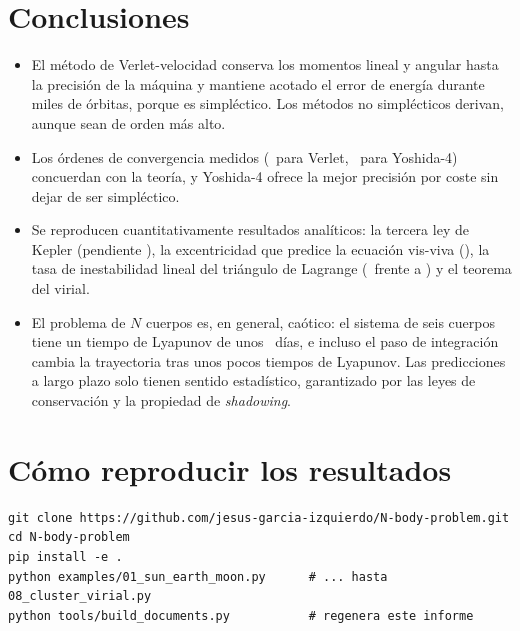 \documentclass[11pt,a4paper]{article}
\begin{document}
\section{Conclusiones}

\begin{itemize}
  \item El método de Verlet-velocidad conserva los momentos lineal y angular hasta la
        precisión de la máquina y mantiene acotado el error de energía durante miles de
        órbitas, porque es simpléctico. Los métodos no simplécticos derivan, aunque sean de
        orden más alto.
  \item Los órdenes de convergencia medidos (\OrderVerlet\ para Verlet, \OrderYoshida\ para
        Yoshida-4) concuerdan con la teoría, y Yoshida-4 ofrece la mejor precisión por coste
        sin dejar de ser simpléctico.
  \item Se reproducen cuantitativamente resultados analíticos: la tercera ley de Kepler
        (pendiente \SolarSlope), la excentricidad que predice la ecuación vis-viva
        (\FourEcc), la tasa de inestabilidad lineal del triángulo de Lagrange (\LagSigma\
        frente a \LagSigmaTh) y el teorema del virial.
  \item El problema de $N$ cuerpos es, en general, caótico: el sistema de seis cuerpos tiene
        un tiempo de Lyapunov de unos \ChaosLyapDays\ días, e incluso el paso de integración
        cambia la trayectoria tras unos pocos tiempos de Lyapunov. Las predicciones a largo
        plazo solo tienen sentido estadístico, garantizado por las leyes de conservación y
        la propiedad de \emph{shadowing}.
\end{itemize}

\appendix
\section{Cómo reproducir los resultados}

\begin{verbatim}
git clone https://github.com/jesus-garcia-izquierdo/N-body-problem.git
cd N-body-problem
pip install -e .
python examples/01_sun_earth_moon.py      # ... hasta 08_cluster_virial.py
python tools/build_documents.py           # regenera este informe
\end{verbatim}
\end{document}
